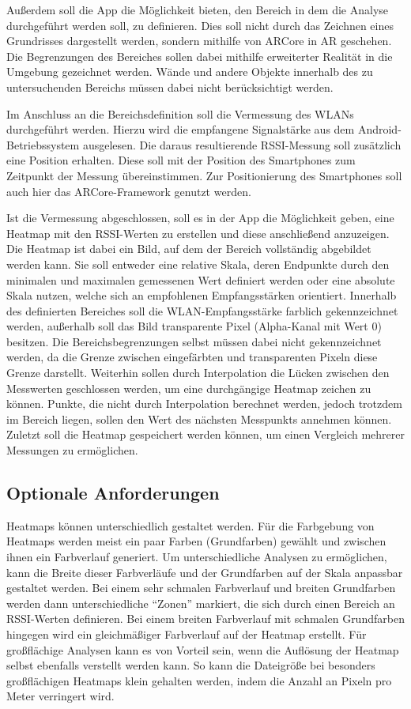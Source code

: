 \documentclass[10pt]{scrartcl}
\begin{document}
Außerdem soll die App die Möglichkeit bieten, den Bereich in dem die Analyse durchgeführt werden soll, zu definieren. Dies soll nicht durch das Zeichnen eines Grundrisses dargestellt werden, sondern mithilfe von ARCore in AR geschehen. Die Begrenzungen des Bereiches sollen dabei mithilfe erweiterter Realität in die Umgebung gezeichnet werden. Wände und andere Objekte innerhalb des zu untersuchenden Bereichs müssen dabei nicht berücksichtigt werden.

Im Anschluss an die Bereichsdefinition soll die Vermessung des WLANs durchgeführt werden. Hierzu wird die empfangene Signalstärke aus dem Android-Betriebssystem ausgelesen. Die daraus resultierende RSSI-Messung soll zusätzlich eine Position erhalten. Diese soll mit der Position des Smartphones zum Zeitpunkt der Messung übereinstimmen. Zur Positionierung des Smartphones soll auch hier das ARCore-Framework genutzt werden.

Ist die Vermessung abgeschlossen, soll es in der App die Möglichkeit geben, eine Heatmap mit den RSSI-Werten zu erstellen und diese anschließend anzuzeigen. Die Heatmap ist dabei ein Bild, auf dem der Bereich vollständig abgebildet werden kann. Sie soll entweder eine relative Skala, deren Endpunkte durch den minimalen und maximalen gemessenen Wert definiert werden oder eine absolute Skala nutzen, welche sich an empfohlenen Empfangsstärken orientiert. Innerhalb des definierten Bereiches soll die WLAN-Empfangsstärke farblich gekennzeichnet werden, außerhalb soll das Bild transparente Pixel (Alpha-Kanal mit Wert 0) besitzen. Die Bereichsbegrenzungen selbst müssen dabei nicht gekennzeichnet werden, da die Grenze zwischen eingefärbten und transparenten Pixeln diese Grenze darstellt. Weiterhin sollen durch Interpolation die Lücken zwischen den Messwerten geschlossen werden, um eine durchgängige Heatmap zeichen zu können. Punkte, die nicht durch Interpolation berechnet werden, jedoch trotzdem im Bereich liegen, sollen den Wert des nächsten Messpunkts annehmen können. Zuletzt soll die Heatmap gespeichert werden können, um einen Vergleich mehrerer Messungen zu ermöglichen.

\subsection{Optionale Anforderungen}
Heatmaps können unterschiedlich gestaltet werden. Für die Farbgebung von Heatmaps werden meist ein paar Farben (Grundfarben) gewählt und zwischen ihnen ein Farbverlauf generiert. Um unterschiedliche Analysen zu ermöglichen, kann die Breite dieser Farbverläufe und der Grundfarben auf der Skala anpassbar gestaltet werden. Bei einem sehr schmalen Farbverlauf und breiten Grundfarben werden dann unterschiedliche \enquote{Zonen} markiert, die sich durch einen Bereich an RSSI-Werten definieren. Bei einem breiten Farbverlauf mit schmalen Grundfarben hingegen wird ein gleichmäßiger Farbverlauf auf der Heatmap erstellt. Für großflächige Analysen kann es von Vorteil sein, wenn die Auflösung der Heatmap selbst ebenfalls verstellt werden kann. So kann die Dateigröße bei besonders großflächigen Heatmaps klein gehalten werden, indem die Anzahl an Pixeln pro Meter verringert wird.
\end{document}
